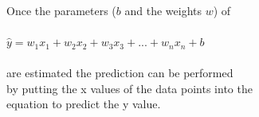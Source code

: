 \documentclass[aspectratio=169]{beamer}
\begin{document}
\begin{frame}
  \frametitle{}
  \begin{block}{}
    \begin{center}
      Once the parameters ($b$ and the weights $w$) of\\
      \ \\
      $\hat{y} = w_{1}x_{1} + w_{2}x_{2} + w_{3}x_{3} + ... + w_{n}x_{n} + b$\\
      \ \\
      are estimated the prediction can be performed\\
      by putting the x values of the data points into the\\
      equation to predict the y value.
    \end{center}
  \end{block}
\end{frame}





  
  
  

\end{document}

